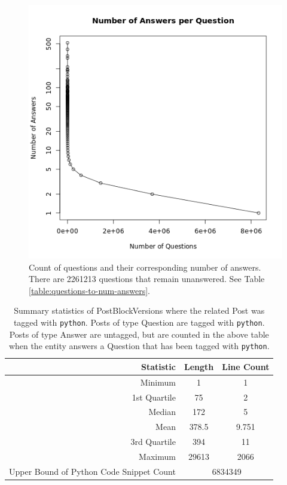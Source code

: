 \documentclass[a4paper,11pt, notitlepage]{report}
\theoremstyle{definition}
\numberwithin{equation}{section}		%
\begin{document}
\begin{figure}[ht]
    \centering
    \includegraphics[width=6in]{figures/num_ans_per_question.png}
    \caption{Count of questions and their corresponding number of answers. There are 2261213 questions that remain unanswered. See Table \ref{table:questions-to-num-answers}.}
    \label{fig:questions-to-num-answers}
\end{figure}

\begin{table}[ht]
    \centering
    \begin{tabular}{r|cc}
    \hline
    \textbf{Statistic} & \textbf{Length} &\textbf{Line Count} \\ \hline
    Minimum         & 1     & 1     \\  
    1st Quartile    & 75    & 2     \\
    Median          & 172   & 5     \\
    Mean            & 378.5 & 9.751 \\
    3rd Quartile    & 394   & 11    \\
    Maximum         & 29613 & 2066  \\ \hline
    Upper Bound of Python Code Snippet Count & \multicolumn{2}{c}{6834349} \\
    \end{tabular}
    \caption{Summary statistics of PostBlockVersions where the related Post was tagged with \texttt{python}. Posts of type Question are tagged with \texttt{python}. Posts of type Answer are untagged, but are counted in the above table when the entity answers a Question that has been tagged with \texttt{python}.}
    \label{tab:python-snippets-summary}
\end{table}
\end{document}
